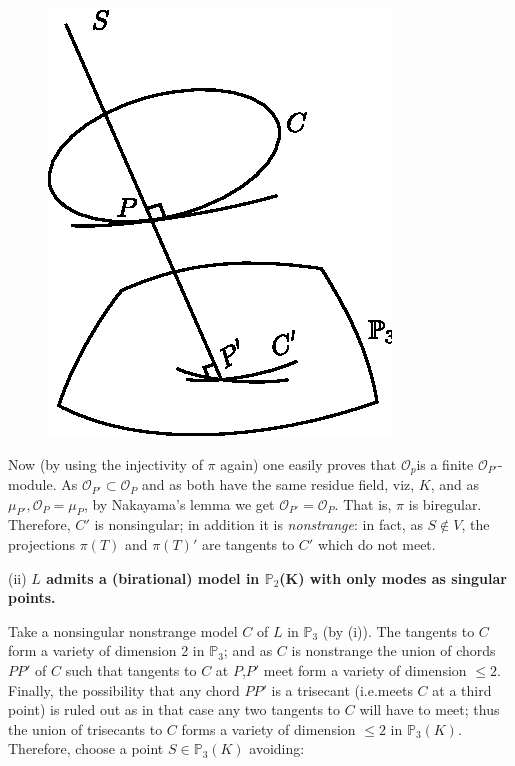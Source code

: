 \begin{minipage}{4cm}
\begin{figure}[H]
\centerline{\includegraphics{vol36-figures/fig36-4.eps}}
\end{figure}
\end{minipage}\qquad  
\begin{minipage}{5.5cm}
  Now (by using the injectivity of $\pi$ again) one easily proves that
  ${\mathscr{O}_p}$is a finite ${\mathscr{O}_{P'}}$-module. As
  ${\mathscr{O}_{P'}\subset\mathscr{O}_P}$ and as both have the same
  residue field, viz, $K$, and as ${\mu_{P'},\mathscr{O}_P = \mu_{P}}$, by
  Nakayama's lemma we get ${\mathscr{O}_{P'} = \mathscr{O}_P}$. That is,
  $\pi$ is biregular. Therefore, $C'$ is nonsingular; in addition it is
  \textit{nonstrange}: in fact, as $S \notin V$, the projections $\pi (T)$
  and $\pi(T)'$ are tangents to $C'$ which do not meet. 
\end{minipage}
\bigskip
\pageoriginale

(ii) {\bf  $L$ admits a (birational) model in $\mathbb{P}_2$(K) with
  only modes as singular points.} 

Take a nonsingular nonstrange model $C$ of $L$ in $\mathbb{P}_3$
(by (i)). The tangents to $C$ form a variety of dimension 2 in
$\mathbb{P}_3$; and as $C$ is nonstrange the union of chords $PP'$ of
$C$ such that tangents to $C$ at $P$,$P'$ meet form a variety of
dimension $\leq 2$. Finally, the possibility that any chord $PP'$ is a
trisecant (i.e.meets $C$ at a third point) is ruled out as in that
case any two tangents to $C$ will have to meet; thus the union of
trisecants to $C$ forms a variety of dimension $\leq 2$ in
$\mathbb{P}_{3} (K)$. Therefore, choose a point $S \in\mathbb{P}_3
(K)$ avoiding: 

